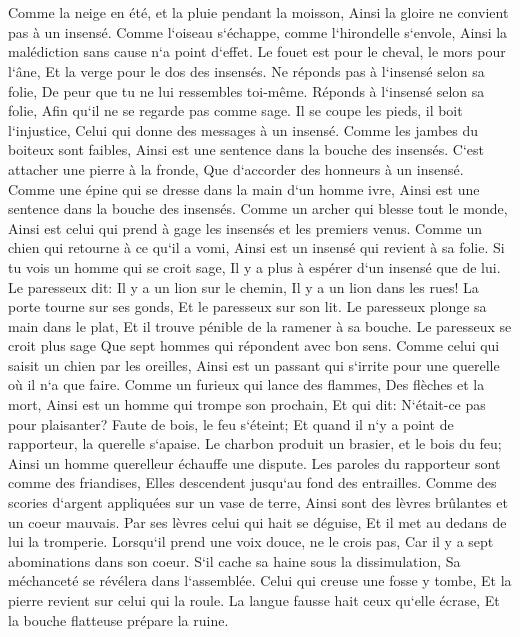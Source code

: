 \chapter{}

\verse Comme la neige en été, et la pluie pendant la moisson, Ainsi la gloire ne convient pas à un insensé. 
\verse Comme l`oiseau s`échappe, comme l`hirondelle s`envole, Ainsi la malédiction sans cause n`a point d`effet. 
\verse Le fouet est pour le cheval, le mors pour l`âne, Et la verge pour le dos des insensés. 
\verse Ne réponds pas à l`insensé selon sa folie, De peur que tu ne lui ressembles toi-même. 
\verse Réponds à l`insensé selon sa folie, Afin qu`il ne se regarde pas comme sage. 
\verse Il se coupe les pieds, il boit l`injustice, Celui qui donne des messages à un insensé. 
\verse Comme les jambes du boiteux sont faibles, Ainsi est une sentence dans la bouche des insensés. 
\verse C`est attacher une pierre à la fronde, Que d`accorder des honneurs à un insensé. 
\verse Comme une épine qui se dresse dans la main d`un homme ivre, Ainsi est une sentence dans la bouche des insensés. 
\verse Comme un archer qui blesse tout le monde, Ainsi est celui qui prend à gage les insensés et les premiers venus. 
\verse Comme un chien qui retourne à ce qu`il a vomi, Ainsi est un insensé qui revient à sa folie. 
\verse Si tu vois un homme qui se croit sage, Il y a plus à espérer d`un insensé que de lui. 
\verse Le paresseux dit: Il y a un lion sur le chemin, Il y a un lion dans les rues! 
\verse La porte tourne sur ses gonds, Et le paresseux sur son lit. 
\verse Le paresseux plonge sa main dans le plat, Et il trouve pénible de la ramener à sa bouche. 
\verse Le paresseux se croit plus sage Que sept hommes qui répondent avec bon sens. 
\verse Comme celui qui saisit un chien par les oreilles, Ainsi est un passant qui s`irrite pour une querelle où il n`a que faire. 
\verse Comme un furieux qui lance des flammes, Des flèches et la mort, 
\verse Ainsi est un homme qui trompe son prochain, Et qui dit: N`était-ce pas pour plaisanter? 
\verse Faute de bois, le feu s`éteint; Et quand il n`y a point de rapporteur, la querelle s`apaise. 
\verse Le charbon produit un brasier, et le bois du feu; Ainsi un homme querelleur échauffe une dispute. 
\verse Les paroles du rapporteur sont comme des friandises, Elles descendent jusqu`au fond des entrailles. 
\verse Comme des scories d`argent appliquées sur un vase de terre, Ainsi sont des lèvres brûlantes et un coeur mauvais. 
\verse Par ses lèvres celui qui hait se déguise, Et il met au dedans de lui la tromperie. 
\verse Lorsqu`il prend une voix douce, ne le crois pas, Car il y a sept abominations dans son coeur. 
\verse S`il cache sa haine sous la dissimulation, Sa méchanceté se révélera dans l`assemblée. 
\verse Celui qui creuse une fosse y tombe, Et la pierre revient sur celui qui la roule. 
\verse La langue fausse hait ceux qu`elle écrase, Et la bouche flatteuse prépare la ruine. 

